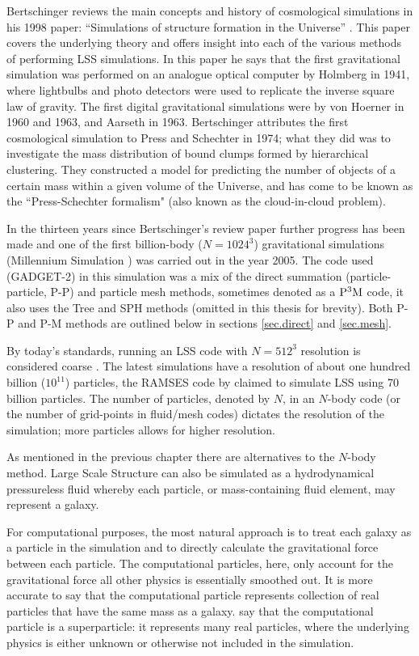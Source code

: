 Bertschinger reviews the main concepts and history of cosmological simulations in his 1998 paper: ``Simulations of structure formation in the Universe'' \citep{bib_bert}. This paper covers the underlying theory and offers insight into each of the various methods of performing LSS simulations. In this paper he says that the first gravitational simulation was performed on an analogue optical computer by Holmberg in 1941, where lightbulbs and photo detectors were used to replicate the inverse square law of gravity. The first digital gravitational simulations were by von Hoerner in 1960 and 1963, and Aarseth in 1963. Bertschinger attributes the first cosmological simulation to Press and Schechter in 1974; what they did was to investigate the mass distribution of bound clumps formed by hierarchical clustering. They constructed a model for predicting the number of objects of a certain mass within a given volume of the Universe, and has come to be known as the ``Press-Schechter formalism" \citep{bib_pres} (also known as the cloud-in-cloud problem).

In the thirteen years since Bertschinger's review paper further progress has been made and one of the first billion-body ($N = 1024^3$) gravitational simulations (Millennium Simulation \citep{bib_spr}) was carried out in the year 2005. The code used (GADGET-2) in this simulation was a mix of the direct summation (particle-particle, P-P) and particle mesh methods, sometimes denoted as a ${\rm P^3 M}$ code, it also uses the Tree and SPH methods (omitted in this thesis for brevity). Both P-P and P-M methods are outlined below in sections \ref{sec.direct} and \ref{sec.mesh}.

By today's standards, running an LSS code with $N = 512^3$ resolution is considered coarse \citep{bib_hmpc}. The latest simulations have a resolution of about one hundred billion ($10^{11}$) particles, the RAMSES code by \citet{bib_tess} claimed to simulate LSS using 70 billion particles. The number of particles, denoted by $N$, in an $N$-body code (or the number of grid-points in fluid/mesh codes) dictates the resolution of the simulation; more particles allows for higher resolution.

As mentioned in the previous chapter there are alternatives to the $N$-body method. Large Scale Structure can also be simulated as a hydrodynamical pressureless fluid whereby each particle, or mass-containing fluid element, may represent a galaxy.

For computational purposes, the most natural approach is to treat each galaxy as a particle in the simulation and to directly calculate the gravitational force between each particle. The computational particles, here, only account for the gravitational force all other physics is essentially smoothed out. It is more accurate to say that the computational particle represents collection of real particles that have the same mass as a galaxy. \citet{bib_he} say that the computational particle is a superparticle: it represents many real particles, where the underlying physics is either unknown or otherwise not included in the simulation.

